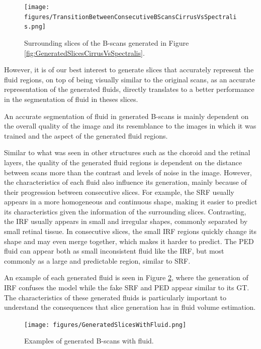 \begin{figure}[!ht]
	\centering	\texttt{[image: figures/TransitionBetweenConsecutiveBScansCirrusVsSpectralis.png]}
	\caption{Surrounding slices of the B-scans generated in Figure \ref{fig:GeneratedSlicesCirrusVsSpectralis}.}
	\label{fig:TransitionBetweenConsecutiveBScansCirrusVsSpectralis}
\end{figure}

However, it is of our best interest to generate slices that accurately represent the fluid regions, on top of being visually similar to the original scans, as an accurate representation of the generated fluids, directly translates to a better performance in the segmentation of fluid in theses slices. 
\par
An accurate segmentation of fluid in generated B-scans is mainly dependent on the overall quality of the image and its resemblance to the images in which it was trained and the aspect of the generated fluid regions.
\par
Similar to what was seen in other structures such as the choroid and the retinal layers, the quality of the generated fluid regions is dependent on the distance between scans more than the contrast and levels of noise in the image. However, the characteristics of each fluid also influence its generation, mainly because of their progression between consecutive slices. For example, the SRF usually appears in a more homogeneous and continuous shape, making it easier to predict its characteristics given the information of the surrounding slices. Contrasting, the IRF usually appears in small and irregular shapes, commonly separated by small retinal tissue. In consecutive slices, the small IRF regions quickly change its shape and may even merge together, which makes it harder to predict. The PED fluid can appear both as small inconsistent fluid like the IRF, but most commonly as a large and predictable region, similar to SRF.
\par
An example of each generated fluid is seen in Figure \ref{fig:GeneratedSlicesWithFluid}, where the generation of IRF confuses the model while the fake SRF and PED appear similar to its GT. The characteristics of these generated fluids is particularly important to understand the consequences that slice generation has in fluid volume estimation.

\begin{figure}[!ht]
	\centering	\texttt{[image: figures/GeneratedSlicesWithFluid.png]}
	\caption{Examples of generated B-scans with fluid.}
	\label{fig:GeneratedSlicesWithFluid}
\end{figure}

